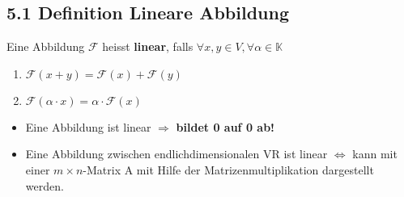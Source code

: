 \subsection{5.1 Definition Lineare Abbildung}{
\vskip1pt
Eine Abbildung $\mathcal{F}$ heisst \textbf{linear}, falls $\forall x, y \in V, \forall \alpha \in \mathbb{K}$
\vskip8pt
\begin{center}
\begin{minipage}[t]{0.6 \columnwidth}
\begin{enumerate}[label=\protect\circled{\arabic*}]
\item $\mathcal{F}(x + y) = \mathcal{F}(x) + \mathcal{F}(y)$
\item $\mathcal{F}(\alpha \cdot x) = \alpha \cdot \mathcal{F}(x)$
\end{enumerate}
\end{minipage}
\end{center}
\vspace{0pt}

\begin{itemize}[leftmargin=0.29cm, itemsep=0.5pt]
\item Eine Abbildung ist linear $\Longrightarrow$ \textbf{bildet 0 auf 0 ab!}
\item Eine Abbildung zwischen endlichdimensionalen VR ist linear $\Longleftrightarrow$ kann mit einer $m \times n$-Matrix A mit Hilfe der Matrizenmultiplikation dargestellt werden.
\end{itemize}
\vspace{-5pt}
}
\WhiteSpace
